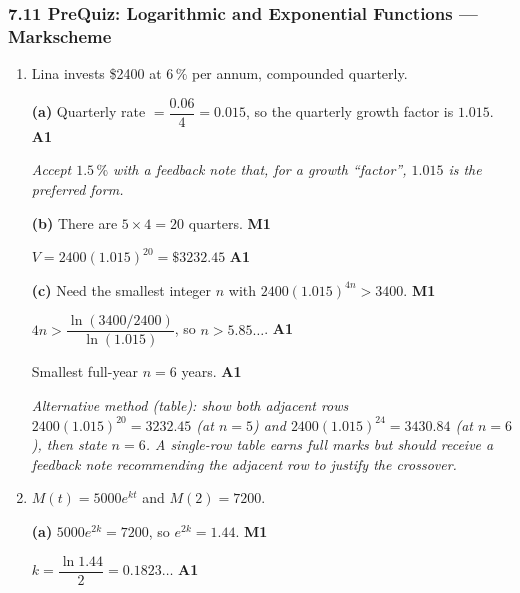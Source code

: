 \documentclass[12pt, twoside]{article}
\begin{document}
\subsubsection*{7.11 PreQuiz: Logarithmic and Exponential Functions ---
Markscheme}

\begin{enumerate}[itemsep=0.3cm]

\item[1.] [Maximum mark: 6]

Lina invests \$2400 at $6\,\%$ per annum, compounded quarterly.

\medskip

\textbf{(a)} Quarterly rate $=\dfrac{0.06}{4}=0.015$, so the quarterly
growth factor is $1.015$. \hfill \textbf{A1}

\emph{Accept $1.5\,\%$ with a feedback note that, for a growth
``factor'', $1.015$ is the preferred form.}

\medskip

\textbf{(b)} There are $5 \times 4 = 20$ quarters. \hfill \textbf{M1}

$V=2400(1.015)^{20}=\$3232.45$ \hfill \textbf{A1}

\medskip

\textbf{(c)} Need the smallest integer $n$ with
$2400(1.015)^{4n}>3400$. \hfill \textbf{M1}

$4n>\dfrac{\ln(3400/2400)}{\ln(1.015)}$, so
$n>5.85\ldots$. \hfill \textbf{A1}

Smallest full-year $n=6$ years. \hfill \textbf{A1}

\emph{Alternative method (table): show both adjacent rows
$2400(1.015)^{20}=3232.45$ (at $n=5$) and $2400(1.015)^{24}=3430.84$
(at $n=6$), then state $n=6$. A single-row table earns full marks but
should receive a feedback note recommending the adjacent row to
justify the crossover.}

\newpage

\item[2.] [Maximum mark: 6]

$M(t)=5000e^{kt}$ and $M(2)=7200$.

\medskip

\textbf{(a)} $5000e^{2k}=7200$, so $e^{2k}=1.44$. \hfill \textbf{M1}

$k=\dfrac{\ln 1.44}{2}=0.1823\ldots$ \hfill \textbf{A1}

\medskip


\end{enumerate}
\end{document}
